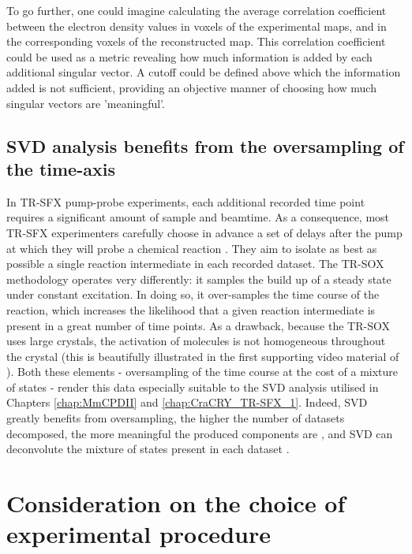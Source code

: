 \vspace{2mm}

To go further, one could imagine calculating the average correlation coefficient between the electron density values in voxels of the experimental maps, and in the corresponding voxels of the reconstructed map. This correlation coefficient could be used as a metric revealing how much information is added by each additional singular vector. A cutoff could be defined above which the information added is not sufficient, providing an objective manner of choosing how much singular vectors are 'meaningful'. 

\subsection{SVD analysis benefits from the oversampling of the time-axis}

In TR-SFX pump-probe experiments, each additional recorded time point requires a significant amount of sample and beamtime. As a consequence, most TR-SFX experimenters carefully choose in advance a set of delays after the pump at which they will probe a chemical reaction \parencite{barendsSerialFemtosecondCrystallography2022}. They aim to isolate as best as possible a single reaction intermediate in each recorded dataset. The TR-SOX methodology operates very differently: it samples the build up of a steady state under constant excitation. In doing so, it over-samples the time course of the reaction, which increases the likelihood that a given reaction intermediate is present in a great number of time points. As a drawback, because the TR-SOX uses large crystals, the activation of molecules is not homogeneous throughout the crystal (this is beautifully illustrated in the first supporting video material of \cite{aumonierMillisecondTimeresolvedSerial2020}). Both these elements - oversampling of the time course at the cost of a mixture of states - render this data especially suitable to the SVD analysis utilised in Chapters \ref{chap:MmCPDII} and \ref{chap:CraCRY_TR-SFX_1}. Indeed, SVD greatly benefits from oversampling, the higher the number of datasets decomposed, the more meaningful the produced components are \parencite{henrySingularValueDecomposition1992}, and SVD can deconvolute the mixture of states present in each dataset \parencite{schmidtApplicationSingularValue2003}. 

\section{Consideration on the choice of experimental procedure}

